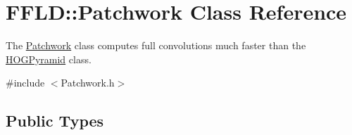 \hypertarget{class_f_f_l_d_1_1_patchwork}{\section{F\-F\-L\-D\-:\-:Patchwork Class Reference}
\label{class_f_f_l_d_1_1_patchwork}
}


The \hyperlink{class_f_f_l_d_1_1_patchwork}{Patchwork} class computes full convolutions much faster than the \hyperlink{class_f_f_l_d_1_1_h_o_g_pyramid}{H\-O\-G\-Pyramid} class.  




{\ttfamily \#include $<$Patchwork.\-h$>$}

\subsection*{Public Types}
